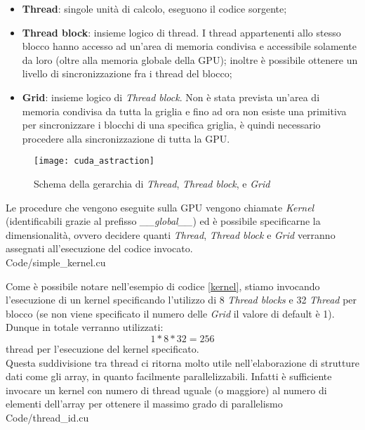 \begin{itemize}
    \item
        \textbf{Thread}: singole unità di calcolo, eseguono il codice sorgente;
    \item
        \textbf{Thread block}: insieme logico di thread. I thread appartenenti
        allo stesso blocco hanno accesso ad un'area di memoria condivisa e
        accessibile solamente da loro (oltre alla memoria globale della GPU);
        inoltre è possibile ottenere un livello di sincronizzazione fra i thread
        del blocco;
    \item
        \textbf{Grid}: insieme logico di \textit{Thread block}. Non è stata
        prevista un'area di memoria condivisa da tutta la griglia e fino ad ora non
        esiste una primitiva per sincronizzare i blocchi di una specifica
        griglia, è quindi necessario procedere alla sincronizzazione di
        tutta la GPU.
\end{itemize}

\begin{figure}[H]
    \centering
    \texttt{[image: cuda\_astraction]}
    \caption{Schema della gerarchia di \textit{Thread}, \textit{Thread block}, e
        \textit{Grid} \cite[p.~59]{nickolls2010gpu}}
\end{figure}

Le procedure che vengono eseguite sulla GPU vengono chiamate \textit{Kernel}
(identificabili grazie al prefisso \textit{\_\_global\_\_})
ed è possibile specificarne la dimensionalità, ovvero decidere quanti
\textit{Thread}, \textit{Thread block} e \textit{Grid} verranno assegnati
all'esecuzione del codice invocato.
\\

    {Code/simple_kernel.cu}

Come è possibile notare nell'esempio di codice \ref{kernel}, stiamo invocando
l'esecuzione di un kernel specificando l'utilizzo di 8 \textit{Thread blocks} e
32 \textit{Thread} per blocco (se non viene specificato il numero delle
\textit{Grid} il valore di default è 1).
\\
Dunque in totale verranno utilizzati: $$1 * 8 * 32 = 256$$ thread per
l'esecuzione del kernel specificato.
\\
Questa suddivisione tra thread ci ritorna molto utile nell'elaborazione di
strutture dati come gli array, in quanto facilmente parallelizzabili.
Infatti è sufficiente invocare un kernel con numero di thread uguale
(o maggiore) al numero di elementi dell'array per ottenere il massimo grado
di parallelismo
\\

    {Code/thread_id.cu}
